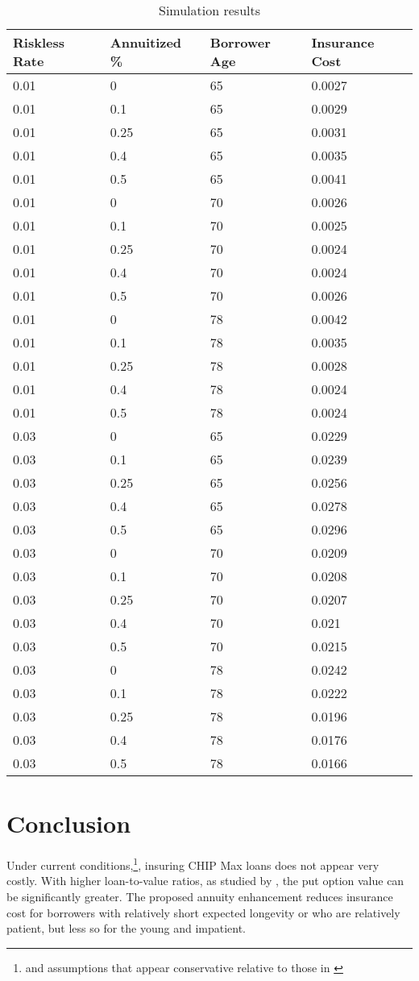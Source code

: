\documentclass[12pt]{article}
\begin{document}
\begin{table}
	\caption{\label{tab:results} Simulation results}
	\begin{tabular}{llll}
		\hline
		Riskless Rate & Annuitized \% & Borrower Age & Insurance Cost\\
		\hline\hline
		0.01& 0& 65& 0.0027\\
		0.01& 0.1& 65& 0.0029\\
		0.01& 0.25& 65& 0.0031\\
		0.01& 0.4& 65& 0.0035\\
		0.01& 0.5& 65& 0.0041\\
		\hline
		0.01& 0& 70& 0.0026\\
		0.01& 0.1& 70& 0.0025\\
		0.01& 0.25& 70& 0.0024\\
		0.01& 0.4& 70& 0.0024\\
		0.01& 0.5& 70& 0.0026\\
		\hline
		0.01& 0& 78& 0.0042\\
		0.01& 0.1& 78& 0.0035\\
		0.01& 0.25& 78& 0.0028\\
		0.01& 0.4& 78& 0.0024\\
		0.01& 0.5& 78& 0.0024\\
		\hline
		0.03& 0& 65& 0.0229\\
		0.03& 0.1& 65& 0.0239\\
		0.03& 0.25& 65& 0.0256\\
		0.03& 0.4& 65& 0.0278\\
		0.03& 0.5& 65& 0.0296\\
		\hline
		0.03& 0& 70& 0.0209\\
		0.03& 0.1& 70& 0.0208\\
		0.03& 0.25& 70& 0.0207\\
		0.03& 0.4& 70& 0.021\\
		0.03& 0.5& 70& 0.0215\\
		\hline
		0.03& 0& 78& 0.0242\\
		0.03& 0.1& 78& 0.0222\\
		0.03& 0.25& 78& 0.0196\\
		0.03& 0.4& 78& 0.0176\\
		0.03& 0.5& 78& 0.0166\\
		\hline\hline
	\end{tabular}
\end{table}

\section{Conclusion}

Under current conditions,\footnote{and assumptions that appear conservative relative to those in \textcite{CoccoLopes}}, insuring CHIP Max loans does not appear very costly. With higher loan-to-value ratios, as studied by \textcite{Davidoffhecmvalue}, the put option value can be significantly greater. The proposed annuity enhancement reduces insurance cost for borrowers with relatively short expected longevity or who are relatively patient, but less so for the young and impatient.

\printbibliography 
\end{document}
